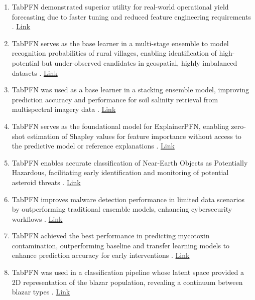 \begin{enumerate}
\item TabPFN demonstrated superior utility for real-world operational yield forecasting due to faster tuning and reduced feature engineering requirements \cite{sabo2025rowsyieldsfoundationmodels}. \href{http://arxiv.org/abs/2506.19046v1}{Link}

\item TabPFN serves as the base learner in a multi-stage ensemble to model recognition probabilities of rural villages, enabling identification of high-potential but under-observed candidates in geospatial, highly imbalanced datasets \cite{jiang2026mitigating}. \href{https://www.mdpi.com/2073-445X/15/4/535}{Link}

\item TabPFN was used as a base learner in a stacking ensemble model, improving prediction accuracy and performance for soil salinity retrieval from multispectral imagery data \cite{hu2026coastal}. \href{https://doi.org/10.3390/rs18050671}{Link}

\item TabPFN serves as the foundational model for ExplainerPFN, enabling zero-shot estimation of Shapley values for feature importance without access to the predictive model or reference explanations \cite{fonseca2026explainerpfntabularfoundationmodels}. \href{http://arxiv.org/abs/2601.23068v1}{Link}

\item TabPFN enables accurate classification of Near-Earth Objects as Potentially Hazardous, facilitating early identification and monitoring of potential asteroid threats \cite{githubGitHubAvuiiAsteroidSafe}. \href{https://github.com/Avuii/AsteroidSafe}{Link}

\item TabPFN improves malware detection performance in limited data scenarios by outperforming traditional ensemble models, enhancing cybersecurity workflows \cite{leroy2026memorybasedmalwaredetectionlimited}. \href{http://arxiv.org/abs/2601.07305v1}{Link}

\item TabPFN achieved the best performance in predicting mycotoxin contamination, outperforming baseline and transfer learning models to enhance prediction accuracy for early interventions \cite{inglis2025predictingmycotoxincontaminationirish}. \href{http://arxiv.org/abs/2512.22243v1}{Link}

\item TabPFN was used in a classification pipeline whose latent space provided a 2D representation of the blazar population, revealing a continuum between blazar types \cite{oukacha2025unifiedschemeblazarevolution}. \href{http://arxiv.org/abs/2507.03088v2}{Link}


\end{enumerate}

